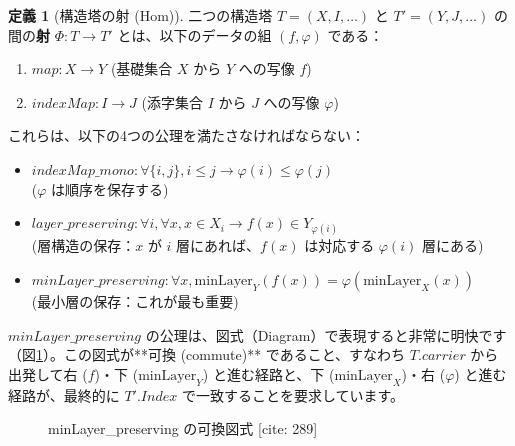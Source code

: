 \documentclass[11pt]{ltjsarticle}
\def\minLayer{minLayer}%
\def\texttt#1{#1}%
\theoremstyle{definition}
\newtheorem{definition}{定義}[section]
\theoremstyle{plain}
\theoremstyle{remark}
\begin{document}
\begin{definition}[構造塔の射 (Hom)]
二つの構造塔 $T = (X, I, \dots)$ と $T' = (Y, J, \dots)$ の間の\textbf{射} $\Phi: T \to T'$ とは、以下のデータの組 $(f, \varphi)$ である：
\begin{enumerate}
    \item $\texttt{map}: X \to Y$ (基礎集合 $X$ から $Y$ への写像 $f$)
    \item $\texttt{indexMap}: I \to J$ (添字集合 $I$ から $J$ への写像 $\varphi$)
\end{enumerate}
これらは、以下の4つの公理を満たさなければならない：
\begin{itemize}
    \item $\texttt{indexMap\_mono}: \forall \{i, j\}, i \le j \to \varphi(i) \le \varphi(j)$
    \\ ($\varphi$ は順序を保存する)
    
    \item $\texttt{layer\_preserving}: \forall i, \forall x, x \in X_i \to f(x) \in Y_{\varphi(i)}$
    \\ (層構造の保存：$x$ が $i$ 層にあれば、$f(x)$ は対応する $\varphi(i)$ 層にある)
    
    \item $\texttt{minLayer\_preserving}: \forall x, \text{minLayer}_Y(f(x)) = \varphi(\text{minLayer}_X(x))$
    \\ (最小層の保存：これが最も重要)
\end{itemize}
\end{definition}

$\texttt{minLayer\_preserving}$ の公理は、図式（Diagram）で表現すると非常に明快です（図\ref{fig:minlayer}）。この図式が**可換 (commute)** であること、すなわち $T.carrier$ から出発して右 ($f$)・下 ($\text{minLayer}_Y$) と進む経路と、下 ($\text{minLayer}_X$)・右 ($\varphi$) と進む経路が、最終的に $T'.Index$ で一致することを要求しています。

\begin{figure}[hbt]
  \centering
  \caption[\texorpdfstring{minLayer\_preserving の可換図式}{minLayer\_preserving diagram}]%
          {\texttt{minLayer\_preserving} の可換図式 [cite: 289]}
  \label{fig:minlayer}
\end{figure}
\end{document}
